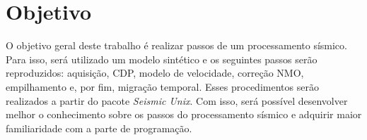 \chapter{Objetivo}
\label{cap1}

O objetivo geral deste trabalho é realizar passos de um processamento sísmico. Para isso, será utilizado um modelo sintético e os seguintes passos serão reproduzidos: aquisição, CDP, modelo de velocidade, correção NMO, empilhamento e, por fim, migração temporal. Esses procedimentos serão realizados a partir do pacote \textit{Seismic Unix}. Com isso, será possível desenvolver melhor o conhecimento sobre os passos do processamento sísmico e adquirir maior familiaridade com a parte de programação.







